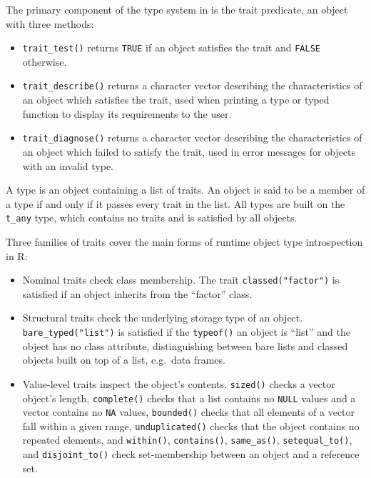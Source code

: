 The primary component of the type system in  is the trait predicate, an  \citep{S7} object with three methods:

\begin{itemize}
\tightlist
\item
  \texttt{trait\_test()} returns \texttt{TRUE} if an object satisfies the trait and \texttt{FALSE} otherwise.
\item
  \texttt{trait\_describe()} returns a character vector describing the characteristics of an object which satisfies the trait, used when printing a type or typed function to display its requirements to the user.
\item
  \texttt{trait\_diagnose()} returns a character vector describing the characteristics of an object which failed to satisfy the trait, used in error messages for objects with an invalid type.
\end{itemize}

A type is an  object containing a list of traits. An object is said to be a member of a type if and only if it passes every trait in the list. All types are built on the \texttt{t\_any} type, which contains no traits and is satisfied by all objects.

Three families of traits cover the main forms of runtime object type introspection in R:

\begin{itemize}
\tightlist
\item
  Nominal traits check class membership. The trait \texttt{classed("factor")} is satisfied if an object inherits from the ``factor'' class.
\item
  Structural traits check the underlying storage type of an object. \texttt{bare\_typed("list")} is satisfied if the \texttt{typeof()} an object is ``list'' and the object has no class attribute, distinguishing between bare lists and classed objects built on top of a list, e.g.~data frames.
\item
  Value-level traits inspect the object's contents. \texttt{sized()} checks a vector object's length, \texttt{complete()} checks that a list contains no \texttt{NULL} values and a vector contains no \texttt{NA} values, \texttt{bounded()} checks that all elements of a vector fall within a given range, \texttt{unduplicated()} checks that the object contains no repeated elements, and \texttt{within()}, \texttt{contains()}, \texttt{same\_as()}, \texttt{setequal\_to()}, and \texttt{disjoint\_to()} check set-membership between an object and a reference set.
\end{itemize}

